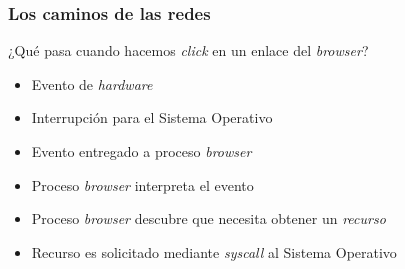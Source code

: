 \documentclass[letter]{beamer}
\begin{document}
\begin{frame}
  \frametitle{Los caminos de las redes}

  ¿Qué pasa cuando hacemos {\em click} en un enlace del {\em browser}?
  
  \begin{itemize}
    \item<2-> Evento de {\em hardware}
    \item<2-> Interrupción para el Sistema Operativo
    \item<2-> Evento entregado a proceso {\em browser}
    \item<3-> Proceso {\em browser} interpreta el evento
    \item<3-> Proceso {\em browser} descubre que necesita obtener un {\em recurso}
    \item<3-> Recurso es solicitado mediante {\em syscall} al Sistema Operativo
  \end{itemize}


\end{frame}
\end{document}
